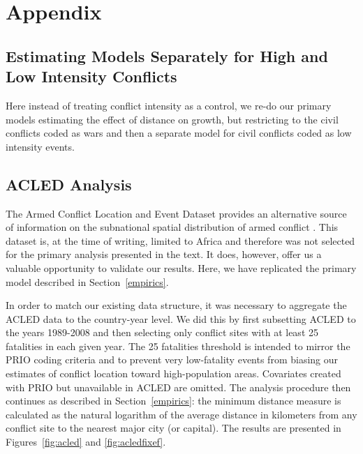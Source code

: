 
\section{Appendix}
\label{appendix}

\subsection{Estimating Models Separately for High and Low Intensity Conflicts}

Here instead of treating conflict intensity as a control, we re-do our primary models estimating the effect of distance on growth, but restricting to the civil conflicts coded as wars and then a separate model for civil conflicts coded as low intensity events. 


\FloatBarrier

\newpage
\subsection{ACLED Analysis}
\label{acled}

The Armed Conflict Location and Event Dataset provides an alternative source of information on the subnational spatial distribution of armed conflict \citep{raleigh:linke:etal:2010}. This dataset is, at the time of writing, limited to Africa and therefore was not selected for the primary analysis presented in the text. It does, however, offer us a valuable opportunity to validate our results. Here, we have replicated the primary model described in Section~\ref{empirics}.

In order to match our existing data structure, it was necessary to aggregate the ACLED data to the country-year level. We did this by first subsetting ACLED to the years 1989-2008 and then selecting only conflict sites with at least 25 fatalities in each given year. The 25 fatalities threshold is intended to mirror the PRIO coding criteria and to prevent very low-fatality events from biasing our estimates of conflict location toward high-population areas. Covariates created with PRIO but unavailable in ACLED are omitted. The analysis procedure then continues as described in Section~\ref{empirics}: the minimum distance measure is calculated as the natural logarithm of the average distance in kilometers from any conflict site to the nearest major city (or capital). The results are presented in Figures~\ref{fig:acled} and \ref{fig:acledfixef}. 

